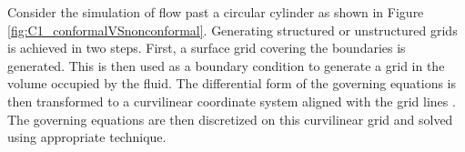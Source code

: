 Consider the simulation of flow past a circular cylinder as shown in Figure \ref{fig:C1_conformalVSnonconformal}. Generating structured or unstructured grids is achieved in two steps. First, a surface grid covering the boundaries is generated. This is then used as a boundary condition to generate a grid in the volume occupied by the fluid. The differential form of the governing equations is then transformed to a curvilinear coordinate system aligned with the grid lines \cite{anderson1995computational}. The governing equations are then discretized on this curvilinear grid and solved using appropriate technique.

%
\begin{figure}[H]
	\centering
	\quad
	\\
\end{figure}
